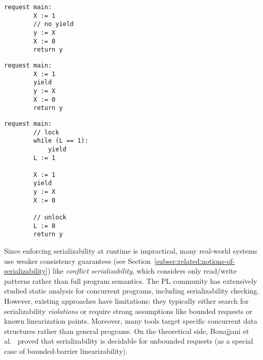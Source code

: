 \noindent
\begin{minipage}[t]{0.45\textwidth}
	\begin{minipage}[t]{\textwidth}
		\begin{lstlisting}[caption={Without yield or lock (serializable)},
			label={lst:MotivatingExample1Ser}]
    request main: 
        X := 1 
        // no yield
        y := X 
        X := 0
        return y 
		\end{lstlisting}
	\end{minipage}
	\vspace{1em}
	\begin{minipage}[t]{\textwidth}
		\begin{lstlisting}[caption={With yield (not serializable)},
			label={lst:MotivatingExample2NonSer}]
    request main: 
        X := 1 
        yield 
        y := X 
        X := 0
        return y 	
		\end{lstlisting}
	\end{minipage}
\end{minipage}%
\hfill
\begin{minipage}[t]{0.45\textwidth}
	\begin{lstlisting}[caption={With yield and lock (serializable)},
		label={lst:MotivatingExample3Ser}]
    request main: 
        // lock
        while (L == 1): 
            yield
        L := 1 

        X := 1
        yield
        y := X 
        X := 0

        // unlock    
        L := 0
        return y 
	\end{lstlisting}
\end{minipage}



Since enforcing serializability at runtime is impractical, many real-world systems use weaker consistency guarantees (see Section~\ref{subsec:related:notions-of-serializability}) like \textit{conflict serializability}, which considers only read/write patterns rather than full program semantics. The PL community has extensively studied static analysis for concurrent programs, including serializability checking. However, existing approaches have limitations: they typically either search for serializability \textit{violations} or require strong assumptions like bounded requests or known linearization points.
Moreover, many tools target specific concurrent data structures rather than general programs.
%
On the theoretical side, Bouajjani et al.~\cite{BoEmEnHa13} proved that serializability is decidable for unbounded requests (as a special case of bounded-barrier linearizability).


